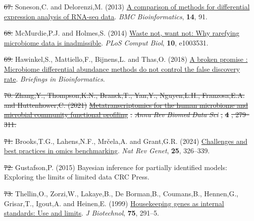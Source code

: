 \documentclass[
]{article}
\newlength{\cslhangindent}
\newenvironment{CSLReferences}[2] %
 {\begin{list}{}{%
  \setlength{\itemindent}{0pt}
  \setlength{\leftmargin}{0pt}
  \setlength{\parsep}{0pt}
  \ifodd #1
   \setlength{\leftmargin}{\cslhangindent}
   \setlength{\itemindent}{-1\cslhangindent}
  \fi
  \setlength{\itemsep}{#2\baselineskip}}}
 {\end{list}}
\providecommand{\DIFadd}[1]{{\protect\color{blue}\uwave{#1}}} %
\providecommand{\DIFdel}[1]{{\protect\color{red}\sout{#1}}}                      %
\providecommand{\DIFaddbegin}{} %
\providecommand{\DIFaddend}{} %
\providecommand{\DIFdelbegin}{} %
\providecommand{\DIFdelend}{} %
\newcommand{\DIFscaledelfig}{0.5}
\newlength{\DIFdelgraphicswidth} %
\newlength{\DIFdelgraphicsheight} %
\newcommand{\DIFaddincludegraphics}[2][]{{\color{blue}\fbox{\DIFOincludegraphics[#1]{#2}}}} %
\newcommand{\DIFdelincludegraphics}[2][]{%
\sbox{\DIFdelgraphicsbox}{\DIFOincludegraphics[#1]{#2}}%
\settoboxwidth{\DIFdelgraphicswidth}{\DIFdelgraphicsbox} %
\settoboxtotalheight{\DIFdelgraphicsheight}{\DIFdelgraphicsbox} %
\scalebox{\DIFscaledelfig}{%
\parbox[b]{\DIFdelgraphicswidth}{\usebox{\DIFdelgraphicsbox}\\[-\baselineskip] \rule{\DIFdelgraphicswidth}{0em}}\llap{\resizebox{\DIFdelgraphicswidth}{\DIFdelgraphicsheight}{%
\setlength{\unitlength}{\DIFdelgraphicswidth}%
\begin{picture}(1,1)%
\thicklines\linethickness{2pt} %
{\color[rgb]{1,0,0}\put(0,0){\framebox(1,1){}}}%
{\color[rgb]{1,0,0}\put(0,0){\line( 1,1){1}}}%
{\color[rgb]{1,0,0}\put(0,1){\line(1,-1){1}}}%
\end{picture}%
}\hspace*{3pt}}} %
} %
\DeclareRobustCommand{\DIFaddbegin}{\DIFOaddbegin \let\includegraphics\DIFaddincludegraphics} %
\DeclareRobustCommand{\DIFaddend}{\DIFOaddend \let\includegraphics\DIFOincludegraphics} %
\DeclareRobustCommand{\DIFdelbegin}{\DIFOdelbegin \let\includegraphics\DIFdelincludegraphics} %
\DeclareRobustCommand{\DIFdelend}{\DIFOaddend \let\includegraphics\DIFOincludegraphics} %
\begin{document}
\begin{CSLReferences}{1}{1}
\DIFdelend {}
\DIFdelbegin \DIFdel{67. }\DIFdelend \DIFaddbegin \DIFadd{56. }\DIFaddend Soneson,C. and Delorenzi,M. (2013)
\href{https://doi.org/10.1186/1471-2105-14-91}{A comparison of methods
for differential expression analysis of {RNA-seq} data}. \emph{BMC
Bioinformatics}, \textbf{14}, 91.

\DIFdelbegin \DIFdel{68. }\DIFdelend \DIFaddbegin \DIFadd{57. }\DIFaddend McMurdie,P.J. and Holmes,S. (2014)
\href{https://doi.org/10.1371/journal.pcbi.1003531}{Waste not, want not:
Why rarefying microbiome data is inadmissible}. \emph{PLoS Comput Biol},
\textbf{10}, e1003531.

\DIFdelbegin \DIFdel{69. }\DIFdelend \DIFaddbegin \DIFadd{58. }\DIFaddend Hawinkel,S., Mattiello,F., Bijnens,L. and Thas,O. (2018)
\href{http://dx.doi.org/10.1093/bib/bbx104}{A broken promise :
Microbiome differential abundance methods do not control the false
discovery rate}. \emph{Briefings in Bioinformatics}.

\DIFdelbegin {}
\DIFdel{70. Zhang,Y., Thompson,K.N., Branck,T., Yan,Y., Nguyen,L.H.,
Franzosa,E.A. and Huttenhower,C. (2021)
}\href{https://doi.org/10.1146/annurev-biodatasci-031121-103035}{\DIFdel{Metatranscriptomics
for the human microbiome and microbial community functional profiling}}%
\DIFdel{.
}\emph{\DIFdel{Annu Rev Biomed Data Sci}}%
\DIFdel{, }\textbf{\DIFdel{4}}%
\DIFdel{, 279--311.
}%

\DIFdelend {}
\DIFdelbegin \DIFdel{71. }\DIFdelend \DIFaddbegin \DIFadd{59. }\DIFaddend Brooks,T.G., Lahens,N.F., Mrčela,A. and Grant,G.R. (2024)
\href{https://doi.org/10.1038/s41576-023-00679-6}{Challenges and best
practices in omics benchmarking}. \emph{Nat Rev Genet}, \textbf{25},
326--339.

\DIFdelbegin \DIFdel{72. }\DIFdelend \DIFaddbegin \DIFadd{60. }\DIFaddend Gustafson,P. (2015) Bayesian inference for partially identified
models: Exploring the limits of limited data CRC Press.

\DIFdelbegin \DIFdel{73. }\DIFdelend \DIFaddbegin \DIFadd{61. }\DIFaddend Thellin,O., Zorzi,W., Lakaye,B., De Borman,B., Coumans,B.,
Hennen,G., Grisar,T., Igout,A. and Heinen,E. (1999)
\href{https://www.ncbi.nlm.nih.gov/pubmed/10617337}{Housekeeping genes
as internal standards: Use and limits}. \emph{J Biotechnol},
\textbf{75}, 291--5.


\end{CSLReferences}
\end{document}
